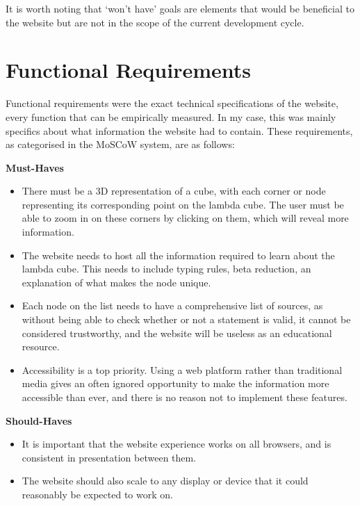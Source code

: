 \documentclass{l4proj}
\begin{document}
It is worth noting that `won't have' goals are elements that would be beneficial to the website but are not in the scope of the current development cycle.

\section{Functional Requirements}

Functional requirements were the exact technical specifications of the website, every function that can be empirically measured.  In my case, this was mainly specifics about what information the website had to contain.  These requirements, as categorised in the MoSCoW system, are as follows:

\textbf{Must-Haves}

\begin{itemize}
    \item There must be a 3D representation of a cube, with each corner or node representing its corresponding point on the lambda cube.  The user must be able to zoom in on these corners by clicking on them, which will reveal more information.

    \item The website needs to host all the information required to learn about the lambda cube.  This needs to include typing rules, beta reduction, an explanation of what makes the node unique.

    \item Each node on the list needs to have a comprehensive list of sources, as without being able to check whether or not a statement is valid, it cannot be considered trustworthy, and the website will be useless as an educational resource.

    \item Accessibility is a top priority.  Using a web platform rather than traditional media gives an often ignored opportunity to make the information more accessible than ever, and there is no reason not to implement these features.
    
\end{itemize}

\textbf{Should-Haves}

\begin{itemize}
    \item It is important that the website experience works on all browsers, and is consistent in presentation between them.
    
    \item The website should also scale to any display or device that it could reasonably be expected to work on.
\end{itemize}
\end{document}
